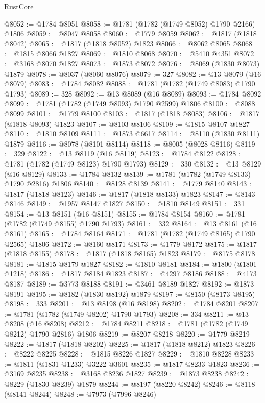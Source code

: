 \begin{lexlean}{RustCore}
\begin{coremodule}
@8052 := @1784 @8051
@8058 := @1781 (@1782 (@1749 @8052) @1790 @2166) @1806
@8059 := @8047 @8058
@8060 := @1779 @8059
@8062 := @1817 (@1818 @8042)
@8065 := @1817 (@1818 @8052) @1823
@8066 := @8062 @8065
@8068 := @1815 @8066 @1827
@8069 := @1810 @8068
@8070 := @5410 @4351
@8072 := @3168 @8070 @1827
@8073 := @1873 @8072
@8076 := @8069 (@1830 @8073) @1879
@8078 := @8037 (@8060 @8076)
@8079 := 327
@8082 := @13 @8079 (@16 @8079)
@8083 := @1784 @8082
@8088 := @1781 (@1782 (@1749 @8083) @1790 @1793)
@8089 := 328
@8092 := @13 @8089 (@16 @8089)
@8093 := @1784 @8092
@8099 := @1781 (@1782 (@1749 @8093) @1790 @2599) @1806
@8100 := @8088 @8099
@8101 := @1779 @8100
@8103 := @1817 (@1818 @8083)
@8106 := @1817 (@1818 @8093) @1823
@8107 := @8103 @8106
@8109 := @1815 @8107 @1827
@8110 := @1810 @8109
@8111 := @1873 @6617
@8114 := @8110 (@1830 @8111) @1879
@8116 := @8078 (@8101 @8114)
@8118 := @8005 (@8028 @8116)
@8119 := 329
@8122 := @13 @8119 (@16 @8119)
@8123 := @1784 @8122
@8128 := @1781 (@1782 (@1749 @8123) @1790 @1793)
@8129 := 330
@8132 := @13 @8129 (@16 @8129)
@8133 := @1784 @8132
@8139 := @1781 (@1782 (@1749 @8133) @1790 @2816) @1806
@8140 := @8128 @8139
@8141 := @1779 @8140
@8143 := @1817 (@1818 @8123)
@8146 := @1817 (@1818 @8133) @1823
@8147 := @8143 @8146
@8149 := @1957 @8147 @1827
@8150 := @1810 @8149
@8151 := 331
@8154 := @13 @8151 (@16 @8151)
@8155 := @1784 @8154
@8160 := @1781 (@1782 (@1749 @8155) @1790 @1793)
@8161 := 332
@8164 := @13 @8161 (@16 @8161)
@8165 := @1784 @8164
@8171 := @1781 (@1782 (@1749 @8165) @1790 @2565) @1806
@8172 := @8160 @8171
@8173 := @1779 @8172
@8175 := @1817 (@1818 @8155)
@8178 := @1817 (@1818 @8165) @1823
@8179 := @8175 @8178
@8181 := @1815 @8179 @1827
@8182 := @1810 @8181
@8184 := @1800 (@1801 @1218)
@8186 := @1817 @8184 @1823
@8187 := @4297 @8186
@8188 := @4173 @8187
@8189 := @3773 @8188
@8191 := @3461 @8189 @1827
@8192 := @1873 @8191
@8195 := @8182 (@1830 @8192) @1879
@8197 := @8150 (@8173 @8195)
@8198 := 333
@8201 := @13 @8198 (@16 @8198)
@8202 := @1784 @8201
@8207 := @1781 (@1782 (@1749 @8202) @1790 @1793)
@8208 := 334
@8211 := @13 @8208 (@16 @8208)
@8212 := @1784 @8211
@8218 := @1781 (@1782 (@1749 @8212) @1790 @2816) @1806
@8219 := @8207 @8218
@8220 := @1779 @8219
@8222 := @1817 (@1818 @8202)
@8225 := @1817 (@1818 @8212) @1823
@8226 := @8222 @8225
@8228 := @1815 @8226 @1827
@8229 := @1810 @8228
@8233 := @1811 (@1831 @1233) @3222 @3601
@8235 := @1817 @8233 @1823
@8236 := @3169 @8235
@8238 := @3168 @8236 @1827
@8239 := @1873 @8238
@8242 := @8229 (@1830 @8239) @1879
@8244 := @8197 (@8220 @8242)
@8246 := @8118 (@8141 @8244)
@8248 := @7973 (@7996 @8246)

\end{coremodule}
\end{lexlean}
